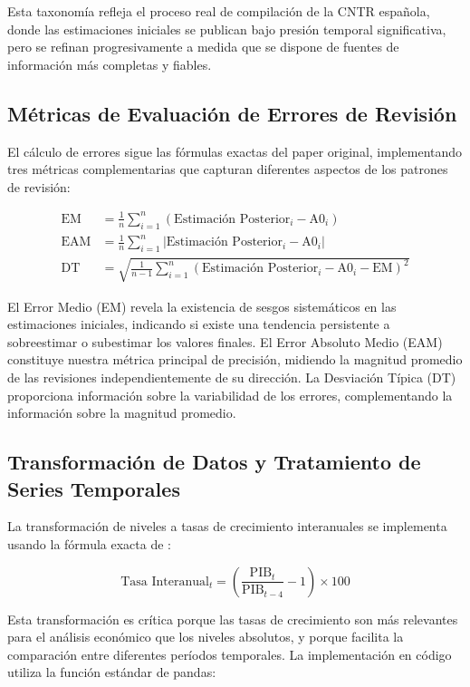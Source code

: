 \documentclass[12pt,a4paper]{article}
\begin{document}
Esta taxonomía refleja el proceso real de compilación de la CNTR española, donde las estimaciones iniciales se publican bajo presión temporal significativa, pero se refinan progresivamente a medida que se dispone de fuentes de información más completas y fiables.

\subsection{Métricas de Evaluación de Errores de Revisión}

El cálculo de errores sigue las fórmulas exactas del paper original, implementando tres métricas complementarias que capturan diferentes aspectos de los patrones de revisión:

\begin{align}
\text{EM} &= \frac{1}{n}\sum_{i=1}^{n}(\text{Estimación Posterior}_i - \text{A0}_i) \label{eq:em}\\
\text{EAM} &= \frac{1}{n}\sum_{i=1}^{n}|\text{Estimación Posterior}_i - \text{A0}_i| \label{eq:eam}\\
\text{DT} &= \sqrt{\frac{1}{n-1}\sum_{i=1}^{n}(\text{Estimación Posterior}_i - \text{A0}_i - \text{EM})^2} \label{eq:dt}
\end{align}

El Error Medio (EM) revela la existencia de sesgos sistemáticos en las estimaciones iniciales, indicando si existe una tendencia persistente a sobreestimar o subestimar los valores finales. El Error Absoluto Medio (EAM) constituye nuestra métrica principal de precisión, midiendo la magnitud promedio de las revisiones independientemente de su dirección. La Desviación Típica (DT) proporciona información sobre la variabilidad de los errores, complementando la información sobre la magnitud promedio.

\subsection{Transformación de Datos y Tratamiento de Series Temporales}

La transformación de niveles a tasas de crecimiento interanuales se implementa usando la fórmula exacta de \citet{pavia2017}:

\begin{equation}
\text{Tasa Interanual}_t = \left(\frac{\text{PIB}_t}{\text{PIB}_{t-4}} - 1\right) \times 100
\end{equation}

Esta transformación es crítica porque las tasas de crecimiento son más relevantes para el análisis económico que los niveles absolutos, y porque facilita la comparación entre diferentes períodos temporales. La implementación en código utiliza la función estándar de pandas:
\end{document}
